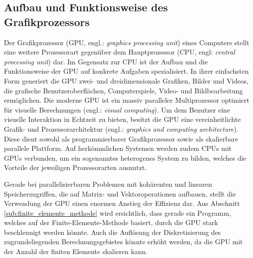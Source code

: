 \documentclass[crop=false]{standalone}
\begin{document}

    \subsection{Aufbau und Funktionsweise des Grafikprozessors} %
    \label{sub:aufbau_und_funktionsweise_des_grafikprozessors}
      Der Grafikprozessor (GPU, engl.: \textit{graphics processing unit}) eines Computers stellt eine weitere Prozessorart gegenüber dem Hauptprozessor (CPU, engl: \textit{central processing unit}) dar.
      Im Gegensatz zur CPU ist der Aufbau und die Funktionsweise der GPU auf konkrete Aufgaben spezialisiert.
      In ihrer einfachsten Form generiert die GPU zwei- und dreidimensionale Grafiken, Bilder und Videos, die grafische Benutzeroberflächen, Computerspiele, Video- und Bildbearbeitung ermöglichen.
      Die moderne GPU ist ein massiv paralleler Multiprozessor optimiert für visuelle Berechnungen (engl.: \textit{visual computing}).
      Um dem Benutzer eine visuelle Interaktion in Echtzeit zu bieten, besitzt die GPU eine vereinheitlichte Grafik- und Prozessorarchitektur (engl.: \textit{graphics and computing architecture}).
      Diese dient sowohl als programmierbarer Grafikprozessor sowie als skalierbare parallele Plattform.
      Auf herkömmlichen Systemen werden zudem CPUs mit GPUs verbunden, um ein sogenanntes heterogenes System zu bilden, welches die Vorteile der jeweiligen Prozessorarten ausnutzt.
      \cite[S.~A3]{Patterson2011}

      Gerade bei parallelisierbaren Problemen mit kohärenten und linearen Speicherzugriffen, die auf Matrix- und Vektoroperationen aufbauen, stellt die Verwendung der GPU einen enormen Anstieg der Effizienz dar.
      Aus Abschnitt \ref{sub:finite_elemente_methode} wird ersichtlich, dass gerade ein Programm, welches auf der Finite-Elemente-Methode basiert, durch die GPU stark beschleunigt werden könnte.
      Auch die Auflösung der Diskretisierung des zugrundeliegenden Berechnungsgebietes könnte erhöht werden, da die GPU mit der Anzahl der finiten Elemente skalieren kann.
\end{document}

